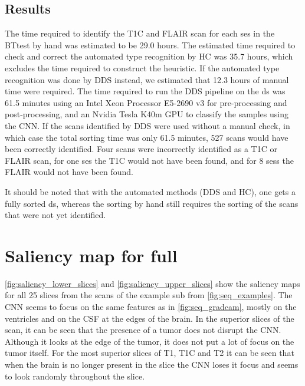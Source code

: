 \begin{subappendices}
\subsection{Results}
The time required to identify the \gls{T1C} and \gls{FLAIR} \gls{scan} for each \gls{ses} in the \gls{BTtest} by hand was estimated to be \num{29.0} hours.
The estimated time required to check and correct the automated \gls{type} recognition by \gls{HC} was \num{35.7} hours, which excludes the time required to construct the heuristic.
If the automated \gls{type} recognition was done by \gls{DDS} instead, we estimated that \num{12.3} hours of manual time were required.
The time required to run the \gls{DDS} pipeline on the \gls{ds} was \num{61.5} minutes using an Intel Xeon Processor E5-2690 v3 for pre-processing and post-processing, and an Nvidia Tesla K40m GPU to classify the \glspl{sample} using the \gls{CNN}.
If the \glspl{scan} identified by \gls{DDS} were used without a manual check, in which case the total sorting time was only \num{61.5} minutes, \num{527} \glspl{scan} would have been correctly identified.
Four \glspl{scan} were incorrectly identified as a \gls{T1C} or \gls{FLAIR} \gls{scan}, for one \gls{ses} the \gls{T1C} would not have been found, and for \num{8} \glspl{ses} the \gls{FLAIR} would not have been found.

It should be noted that with the automated methods (\gls{DDS} and \gls{HC}), one gets a fully sorted \gls{ds}, whereas the sorting by hand still requires the sorting of the \glspl{scan} that were not yet identified.

\clearpage

\section{Saliency map for full }
\label{app:saliency}

\cref{fig:saliency_lower_slices} and \cref{fig:saliency_upper_slices} show the saliency maps for all \num{25} \glspl{slice} from the \glspl{scan} of the example \gls{sub} from \cref{fig:seq_examples}.
The \gls{CNN} seems to focus on the same features as in \cref{fig:seq_gradcam}, mostly on the ventricles and on the \gls{CSF} at the edges of the brain.
In the superior \glspl{slice} of the \gls{scan}, it can be seen that the presence of a \gls{tumor} does not disrupt the \gls{CNN}.
Although it looks at the edge of the \gls{tumor}, it does not put a lot of focus on the \gls{tumor} itself.
For the most superior \glspl{slice} of \gls{T1}, \gls{T1C} and \gls{T2} it can be seen that when the brain is no longer present in the \gls{slice} the \gls{CNN} loses it focus and seems to look randomly throughout the \gls{slice}.


\end{subappendices}
